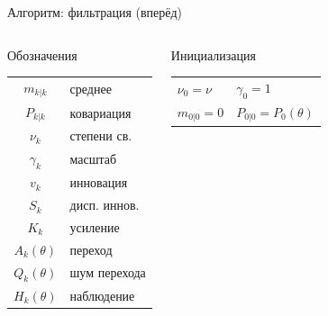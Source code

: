 \documentclass{beamer}
\begin{document}




\begin{frame}{Алгоритм: фильтрация (вперёд)}
\footnotesize

\begin{columns}[T]

    \begin{block}{\footnotesize Обозначения}
        \vspace{2pt}
        {\footnotesize
        \begin{tabular}{cl}
            $m_{k|k}$          & среднее          \\ [3pt]
            $P_{k|k}$          & ковариация        \\[3pt]
            $\nu_k$            & степени св.       \\[3pt]
            $\gamma_k$         & масштаб           \\[3pt]
            $v_k$              & инновация         \\[3pt]
            $S_k$              & дисп. иннов.      \\[3pt]
            $K_k$              & усиление          \\[3pt]
            $A_k(\theta)$      & переход           \\[3pt]
            $Q_k(\theta)$      & шум перехода      \\[3pt]
            $H_k(\theta)$      & наблюдение        \\
        \end{tabular}}
    \end{block}

    \vspace{3pt}

    \begin{block}{\footnotesize Инициализация}
        \vspace{2pt}
        {\footnotesize
        \begin{tabular}{ll}
            $\nu_0    = \nu$         & $\gamma_0 = 1$          \\[3pt]
            $m_{0|0} = 0$            & $P_{0|0} = P_0(\theta)$ \\
        \end{tabular}}
    \end{block}


\end{columns}
\end{frame}
\end{document}
